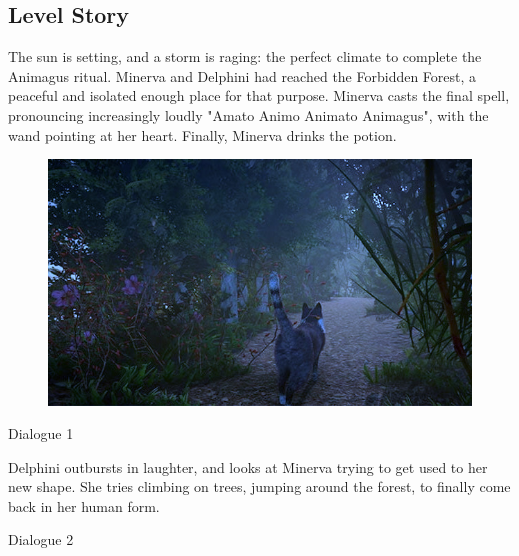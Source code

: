 \subsection{Level Story}

The sun is setting, and a storm is raging: the perfect climate to complete the Animagus ritual. Minerva and Delphini had reached the Forbidden Forest, a peaceful and isolated enough place for that purpose. Minerva casts the final spell, pronouncing increasingly loudly "Amato Animo Animato Animagus", with the wand pointing at her heart. Finally, Minerva drinks the potion.

\begin{figure}[H]
\includegraphics[max width=\textwidth]{../Pictures/Level/Script/Minerva_cat_picture.jpg}
\end{figure} 

\begin{dialogue}{Dialogue 1}
\end{dialogue} 

Delphini outbursts in laughter, and looks at Minerva trying to get used to her new shape. She tries climbing on trees, jumping around the forest, to finally come back in her human form. \\

\pagebreak

\begin{dialogue}{Dialogue 2}
\end{dialogue} 

